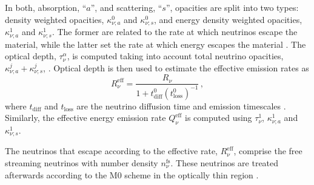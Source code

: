 %
%
In \wisky{} both, absorption, ``$a$'', and scattering, ``$s$'', opacities are split 
into two types: density weighted 
opacities, $\kappa_{\nu;a}^0$ and $\kappa_{\nu;s}^0$, and energy density 
weighted opacities, $\kappa_{\nu;a}^1$ and $\kappa_{\nu;s}^1$. 
The former are related to the rate at which neutrinos escape the material, 
while the latter set the rate at which energy escapes the material 
\citep{Ruffert:1995fs}.
%
The optical depth, $\tau_{\nu}^{\alpha}$, is computed taking into account 
total neutrino opacities, 
$\kappa_{\nu;a}^j + \kappa_{\nu;s}^j$, \citep{Neilsen:2014hha}.
%
Optical depth is then used to estimate the effective emission rates \citep{Ruffert:1995fs} as 
%
\begin{equation}
R_{\nu}^{\text{eff}} = \frac{R_{\nu}}{1 + t_{\text{diff}}^0(t^0_{\text{loss}})^{-1}}\, ,
\label{eq:method:whisky:Rnueff}
\end{equation}
%
where $t_{\text{diff}}$ and $t_{\text{loss}}$ are the neutrino diffusion time and emission timescales 
%
%
%
%
\citep{Radice:2018pdn}.
%
%
Similarly, the effective energy emission rate $Q_{\nu}^{\text{eff}}$ 
is computed using $\tau_{\nu}^1$, $\kappa_{\nu;a}^1$ and $\kappa_{\nu;s}^1$.

The neutrinos that escape according to the effective rate, $R_{\nu}^{\text{eff}}$, 
comprise the free streaming neutrinos with number density $n_{\nu}^{\text{fs}}$. 
%
These neutrinos are treated afterwards according to the 
M0 scheme in the optically thin region \citep{Radice:2016dwd}.

